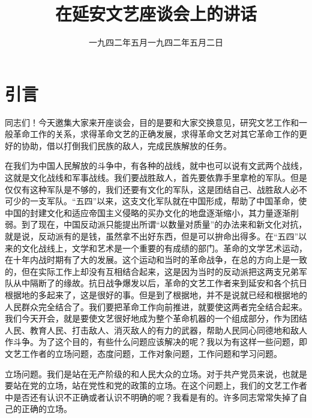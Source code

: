 
\title{在延安文艺座谈会上的讲话}
\date{一九四二年五月}
\maketitle


\date{一九四二年五月二日}
\section{引言}

同志们！今天邀集大家来开座谈会，目的是要和大家交换意见，研究文艺工作和一般革命工作的关系，求得革命文艺的正确发展，求得革命文艺对其它革命工作的更好的协助，借以打倒我们民族的敌人，完成民族解放的任务。

在我们为中国人民解放的斗争中，有各种的战线，就中也可以说有文武两个战线，这就是文化战线和军事战线。我们要战胜敌人，首先要依靠手里拿枪的军队。但是仅仅有这种军队是不够的，我们还要有文化的军队，这是团结自己、战胜敌人必不可少的一支军队。“五四”以来，这支文化军队就在中国形成，帮助了中国革命，使中国的封建文化和适应帝国主义侵略的买办文化的地盘逐渐缩小，其力量逐渐削弱。到了现在，中国反动派只能提出所谓“以数量对质量”的办法来和新文化对抗，就是说，反动派有的是钱，虽然拿不出好东西，但是可以拚命出得多。在“五四”以来的文化战线上，文学和艺术是一个重要的有成绩的部门。革命的文学艺术运动，在十年内战时期有了大的发展。这个运动和当时的革命战争，在总的方向上是一致的，但在实际工作上却没有互相结合起来，这是因为当时的反动派把这两支兄弟军队从中隔断了的缘故。抗日战争爆发以后，革命的文艺工作者来到延安和各个抗日根据地的多起来了，这是很好的事。但是到了根据地，并不是说就已经和根据地的人民群众完全结合了。我们要把革命工作向前推进，就要使这两者完全结合起来。我们今天开会，就是要使文艺很好地成为整个革命机器的一个组成部分，作为团结人民、教育人民、打击敌人、消灭敌人的有力的武器，帮助人民同心同德地和敌人作斗争。为了这个目的，有些什么问题应该解决的呢？我以为有这样一些问题，即文艺工作者的立场问题，态度问题，工作对象问题，工作问题和学习问题。

立场问题。我们是站在无产阶级的和人民大众的立场。对于共产党员来说，也就是要站在党的立场，站在党性和党的政策的立场。在这个问题上，我们的文艺工作者中是否还有认识不正确或者认识不明确的呢？我看是有的。许多同志常常失掉了自己的正确的立场。

